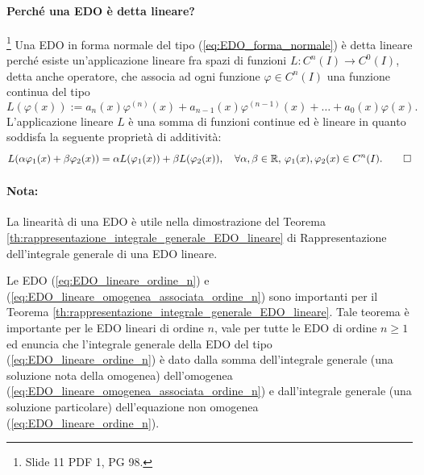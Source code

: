 \paragraph{Perché una EDO è detta lineare?} \footnote{Slide 11 PDF 1, PG 98.} Una EDO in forma normale del tipo (\ref{eq:EDO_forma_normale}) è detta lineare perché esiste un'\gls{applicazione lineare} fra spazi di funzioni $L\colon C^n(I)\rightarrow C^0(I)$, detta anche operatore, che associa ad ogni funzione $\varphi\in C^n(I)$ una funzione continua del tipo
\begin{equation*}
    L(\varphi(x)):=a_n(x)\varphi^{(n)}(x)+a_{n-1}(x)\varphi^{(n-1)}(x)+\hdots+a_0(x)\varphi(x).
\end{equation*}
L'\gls{applicazione lineare} $L$ è una somma di funzioni continue ed è lineare in quanto soddisfa la seguente proprietà di additività:
\begin{equation*}
    L(\alpha\varphi_1(x)+\beta\varphi_2(x))=\alpha L(\varphi_1(x)) + \beta L(\varphi_2(x)),\quad\forall \alpha,\beta\in\mathbb R,\, \varphi_1(x),\varphi_2(x)\in C^n(I). \qed
\end{equation*}

\paragraph{Nota:} La linearità di una EDO è utile nella dimostrazione del Teorema \ref{th:rappresentazione_integrale_generale_EDO_lineare} di Rappresentazione dell'integrale generale di una EDO lineare.

Le EDO (\ref{eq:EDO_lineare_ordine_n}) e (\ref{eq:EDO_lineare_omogenea_associata_ordine_n}) sono importanti per il Teorema \ref{th:rappresentazione_integrale_generale_EDO_lineare}. Tale teorema è importante per le EDO lineari di ordine $n$, vale per tutte le EDO di ordine $n\geq 1$ ed enuncia che l'integrale generale della EDO del tipo (\ref{eq:EDO_lineare_ordine_n}) è dato dalla somma dell'integrale generale (una soluzione nota della omogenea) dell'omogenea (\ref{eq:EDO_lineare_omogenea_associata_ordine_n}) e dall'integrale generale (una soluzione particolare) dell'equazione non omogenea (\ref{eq:EDO_lineare_ordine_n}).

